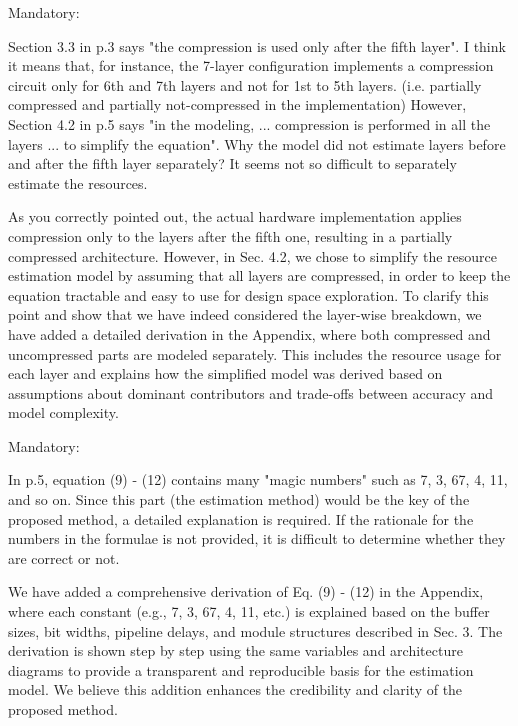 \documentclass[a4j]{jsarticle}
\begin{document}
\vspace{0.3cm}
\begin{screen}
Mandatory:

Section 3.3 in p.3 says "the compression is used only after the fifth layer".
I think it means that, for instance, the 7-layer configuration implements a compression circuit only for 6th and 7th layers and not for 1st to 5th layers. (i.e. partially compressed and partially not-compressed in the implementation)
However, Section 4.2 in p.5 says "in the modeling, ... compression is performed in all the layers ... to simplify the equation".
Why the model did not estimate layers before and after the fifth layer separately? It seems not so difficult to separately estimate the resources.
\end{screen}
As you correctly pointed out, the actual hardware implementation applies compression 
only to the layers after the fifth one, resulting in a partially compressed architecture. 
However, in Sec. 4.2, we chose to simplify the resource estimation model by assuming that all layers 
are compressed, in order to keep the equation tractable and easy to use for design space exploration.
To clarify this point and show that we have indeed considered the layer-wise breakdown, 
we have added a detailed derivation in the Appendix, where both compressed and uncompressed parts 
are modeled separately. This includes the resource usage for each layer and explains how the simplified 
model was derived based on assumptions about dominant contributors and trade-offs between accuracy and model complexity.



\vspace{0.3cm}
\begin{screen}
Mandatory:

In p.5, equation (9) - (12) contains many "magic numbers" such as 7, 3, 67, 4, 11, and so on.
Since this part (the estimation method) would be the key of the proposed method, a detailed explanation is required.
If the rationale for the numbers in the formulae is not provided, it is difficult to determine whether they are correct or not.
\end{screen}
We have added a comprehensive derivation of Eq. (9) - (12) in the Appendix, 
where each constant (e.g., 7, 3, 67, 4, 11, etc.) is explained based on the buffer sizes, 
bit widths, pipeline delays, and module structures described in Sec. 3. 
The derivation is shown step by step using the same variables and architecture diagrams 
to provide a transparent and reproducible basis for the estimation model.
We believe this addition enhances the credibility and clarity of the proposed method.
\end{document}
